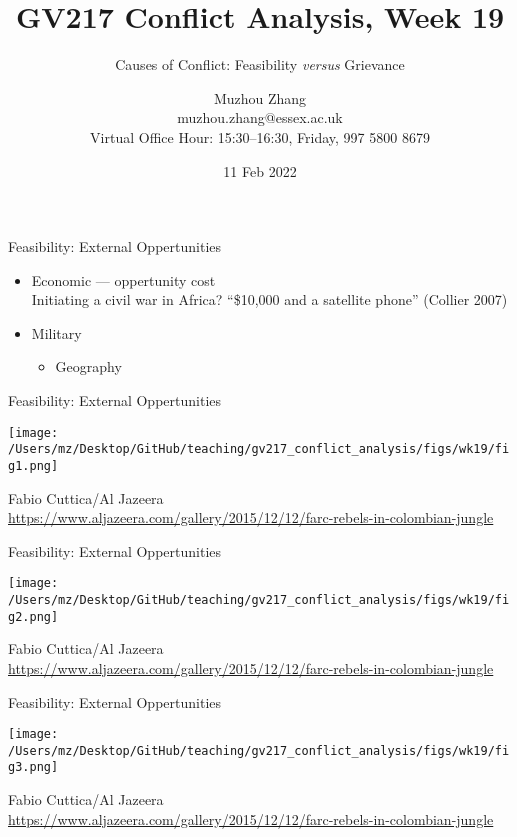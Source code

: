 \documentclass{beamer}
\title{GV217 Conflict Analysis, Week 19}
\subtitle{Causes of Conflict: Feasibility \emph{versus} Grievance}
\author{Muzhou Zhang\\ muzhou.zhang@essex.ac.uk\\ Virtual Office Hour: 15:30--16:30, Friday, 997 5800 8679}
\date{11 Feb 2022}
\begin{document}
\maketitle
{}

\begin{frame}{Feasibility: External Oppertunities}
    \begin{itemize}
        \pause\item Economic --- oppertunity cost\\
        \pause      Initiating a civil war in Africa? ``\$10,000 and a satellite phone'' (Collier 2007)
        \pause\item Military
        \begin{itemize}
            \pause\item Geography
        \end{itemize}
    \end{itemize}
\end{frame}

\begin{frame}{Feasibility: External Oppertunities}
    \begin{center}
        \texttt{[image: /Users/mz/Desktop/GitHub/teaching/gv217\_conflict\_analysis/figs/wk19/fig1.png]}
    \end{center}
    \tiny Fabio Cuttica/Al Jazeera\\ \url{https://www.aljazeera.com/gallery/2015/12/12/farc-rebels-in-colombian-jungle}
\end{frame}

\begin{frame}{Feasibility: External Oppertunities}
    \begin{center}
        \texttt{[image: /Users/mz/Desktop/GitHub/teaching/gv217\_conflict\_analysis/figs/wk19/fig2.png]}
    \end{center}
    \tiny Fabio Cuttica/Al Jazeera\\ \url{https://www.aljazeera.com/gallery/2015/12/12/farc-rebels-in-colombian-jungle}
\end{frame}

\begin{frame}{Feasibility: External Oppertunities}
    \begin{center}
        \texttt{[image: /Users/mz/Desktop/GitHub/teaching/gv217\_conflict\_analysis/figs/wk19/fig3.png]}
    \end{center}
    \tiny Fabio Cuttica/Al Jazeera\\ \url{https://www.aljazeera.com/gallery/2015/12/12/farc-rebels-in-colombian-jungle}
\end{frame}
\end{document}
